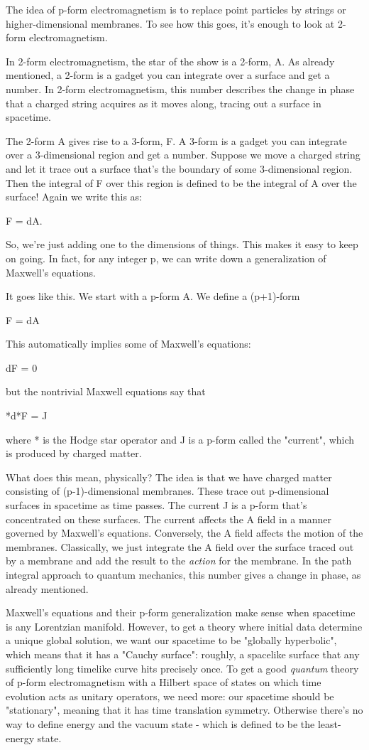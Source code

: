 The idea of p-form electromagnetism is to replace point particles
by strings or higher-dimensional membranes.  To see how this goes,
it's enough to look at 2-form electromagnetism.

In 2-form electromagnetism, the star of the show is a 2-form, A. 
As already mentioned, a 2-form is a gadget you can integrate over a 
surface and get a number.  In 2-form electromagnetism, this number 
describes the change in phase that a charged string acquires as it 
moves along, tracing out a surface in spacetime.  

The 2-form A gives rise to a 3-form, F.  A 3-form is a gadget 
you can integrate over a 3-dimensional region and get a number.  
Suppose we move a charged string and let it trace out a surface 
that's the boundary of some 3-dimensional region.   Then the integral 
of F over this region is defined to be the integral of A over the 
surface!  Again we write this as: 

F = dA.

So, we're just adding one to the dimensions of things.  This makes it 
easy to keep on going.  In fact, for any integer p, we can write down 
a generalization of Maxwell's equations.

It goes like this.  We start with a p-form A.  We define a (p+1)-form

F = dA

This automatically implies some of Maxwell's equations:

dF = 0

but the nontrivial Maxwell equations say that

*d*F = J

where * is the Hodge star operator and J is a p-form called the "current",
which is produced by charged matter.  

What does this mean, physically?  The idea is that we have charged matter 
consisting of (p-1)-dimensional membranes.  These trace out p-dimensional 
surfaces in spacetime as time passes.  The current J is a p-form that's 
concentrated on these surfaces.  The current affects the A field in a 
manner governed by Maxwell's equations.  Conversely, the A field affects 
the motion of the membranes.  Classically, we just integrate the A field 
over the surface traced out by a membrane and add the result to the 
\emph{action} for the membrane.  In the path integral approach to quantum 
mechanics, this number gives a change in phase, as already mentioned.

Maxwell's equations and their p-form generalization make sense when 
spacetime is any Lorentzian manifold.  However, to get a theory 
where initial data determine a unique global solution, we want our 
spacetime to be "globally hyperbolic", which means that it has a 
"Cauchy surface": roughly, a spacelike surface that any sufficiently
long timelike curve hits precisely once.  To get a good \emph{quantum} 
theory of p-form electromagnetism with a Hilbert space of states on which 
time evolution acts as unitary operators, we need more: our spacetime 
should be "stationary", meaning that it has time 
translation symmetry.  
Otherwise there's no way to define energy and the vacuum state - which 
is defined to be the least-energy state.

